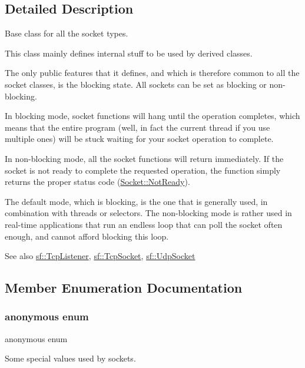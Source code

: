 \subsection{Detailed Description}
Base class for all the socket types. 

This class mainly defines internal stuff to be used by derived classes.

The only public features that it defines, and which is therefore common to all the socket classes, is the blocking state. All sockets can be set as blocking or non-\/blocking.

In blocking mode, socket functions will hang until the operation completes, which means that the entire program (well, in fact the current thread if you use multiple ones) will be stuck waiting for your socket operation to complete.

In non-\/blocking mode, all the socket functions will return immediately. If the socket is not ready to complete the requested operation, the function simply returns the proper status code (\hyperlink{classsf_1_1_socket_a51bf0fd51057b98a10fbb866246176dca8554848daae98f996e131bdeed076c09}{Socket\+::\+Not\+Ready}).

The default mode, which is blocking, is the one that is generally used, in combination with threads or selectors. The non-\/blocking mode is rather used in real-\/time applications that run an endless loop that can poll the socket often enough, and cannot afford blocking this loop.

\begin{DoxySeeAlso}{See also}
\hyperlink{classsf_1_1_tcp_listener}{sf\+::\+Tcp\+Listener}, \hyperlink{classsf_1_1_tcp_socket}{sf\+::\+Tcp\+Socket}, \hyperlink{classsf_1_1_udp_socket}{sf\+::\+Udp\+Socket} 
\end{DoxySeeAlso}


\subsection{Member Enumeration Documentation}
\mbox{\label{classsf_1_1_socket_aca9589996f3038a260724263b12caf71}} 
\subsubsection{\texorpdfstring{anonymous enum}{anonymous enum}}
{\footnotesize\ttfamily anonymous enum}



Some special values used by sockets. 

